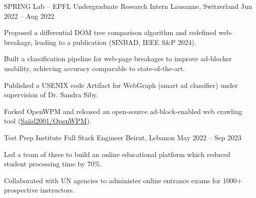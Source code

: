 \begin{cventries}
  \cventry
  {SPRING Lab -- EPFL} %
  {Undergraduate Research Intern} %
  {Lausanne, Switzerland} %
  {Jun 2022 -- Aug 2022} %
  {
    \begin{cvitems} %
      \item {Proposed a differential DOM tree comparison algorithm and redefined web-breakage, leading to a publication (SINBAD, IEEE S\&P 2024).}
      \item {Built a classification pipeline for web-page breakages to improve ad-blocker usability, achieving accuracy comparable to state-of-the-art.}
      \item {Published a USENIX code Artifact for WebGraph (smart ad classifier) under supervision of Dr. Sandra Siby.}
      \item {Forked OpenWPM and released an open-source ad-block-enabled web crawling tool (\href{https://www.github.com/Saiid2001/OpenWPM}{Saiid2001/OpenWPM}).}
    \end{cvitems}
  }




  \cventry
  {Test Prep Institute} %
  {Full Stack Engineer} %
  {Beirut, Lebanon} %
  {May 2022 -- Sep 2023} %
  {
    \begin{cvitems} %
      \item {Led a team of three to build an online educational platform which reduced student processing time by 70\%.}
      \item {Collaborated with UN agencies to administer online entrance exams for 1000+ prospective instructors.}
    \end{cvitems}
  }


\end{cventries}
